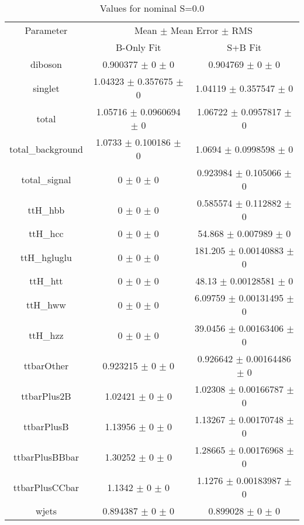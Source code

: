 \begin{table}
\centering
\caption{Values for nominal S=0.0}
\begin{tabular}{ccc}
\toprule
Parameter & \multicolumn{2}{c}{Mean $\pm$ Mean Error $\pm$ RMS}\\
 & B-Only Fit & S+B Fit\\
\midrule
diboson & \num{0.900377} $\pm$ \num{0} $\pm$ \num{0} & \num{0.904769} $\pm$ \num{0} $\pm$ \num{0}\\
singlet & \num{1.04323} $\pm$ \num{0.357675} $\pm$ \num{0} & \num{1.04119} $\pm$ \num{0.357547} $\pm$ \num{0}\\
total & \num{1.05716} $\pm$ \num{0.0960694} $\pm$ \num{0} & \num{1.06722} $\pm$ \num{0.0957817} $\pm$ \num{0}\\
total\_background & \num{1.0733} $\pm$ \num{0.100186} $\pm$ \num{0} & \num{1.0694} $\pm$ \num{0.0998598} $\pm$ \num{0}\\
total\_signal & \num{0} $\pm$ \num{0} $\pm$ \num{0} & \num{0.923984} $\pm$ \num{0.105066} $\pm$ \num{0}\\
ttH\_hbb & \num{0} $\pm$ \num{0} $\pm$ \num{0} & \num{0.585574} $\pm$ \num{0.112882} $\pm$ \num{0}\\
ttH\_hcc & \num{0} $\pm$ \num{0} $\pm$ \num{0} & \num{54.868} $\pm$ \num{0.007989} $\pm$ \num{0}\\
ttH\_hgluglu & \num{0} $\pm$ \num{0} $\pm$ \num{0} & \num{181.205} $\pm$ \num{0.00140883} $\pm$ \num{0}\\
ttH\_htt & \num{0} $\pm$ \num{0} $\pm$ \num{0} & \num{48.13} $\pm$ \num{0.00128581} $\pm$ \num{0}\\
ttH\_hww & \num{0} $\pm$ \num{0} $\pm$ \num{0} & \num{6.09759} $\pm$ \num{0.00131495} $\pm$ \num{0}\\
ttH\_hzz & \num{0} $\pm$ \num{0} $\pm$ \num{0} & \num{39.0456} $\pm$ \num{0.00163406} $\pm$ \num{0}\\
ttbarOther & \num{0.923215} $\pm$ \num{0} $\pm$ \num{0} & \num{0.926642} $\pm$ \num{0.00164486} $\pm$ \num{0}\\
ttbarPlus2B & \num{1.02421} $\pm$ \num{0} $\pm$ \num{0} & \num{1.02308} $\pm$ \num{0.00166787} $\pm$ \num{0}\\
ttbarPlusB & \num{1.13956} $\pm$ \num{0} $\pm$ \num{0} & \num{1.13267} $\pm$ \num{0.00170748} $\pm$ \num{0}\\
ttbarPlusBBbar & \num{1.30252} $\pm$ \num{0} $\pm$ \num{0} & \num{1.28665} $\pm$ \num{0.00176968} $\pm$ \num{0}\\
ttbarPlusCCbar & \num{1.1342} $\pm$ \num{0} $\pm$ \num{0} & \num{1.1276} $\pm$ \num{0.00183987} $\pm$ \num{0}\\
wjets & \num{0.894387} $\pm$ \num{0} $\pm$ \num{0} & \num{0.899028} $\pm$ \num{0} $\pm$ \num{0}\\
\bottomrule
\end{tabular}
\end{table}